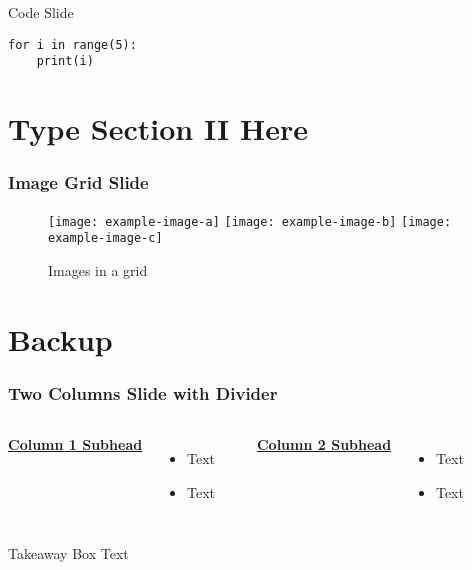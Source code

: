 \documentclass[11pt,aspectratio=169] {beamer}
\begin{document}
\begin{frame}[fragile]{Code Slide}
\begin{verbatim}
for i in range(5):
    print(i)
\end{verbatim}
\end{frame}
\section{Type Section II Here}

\begin{frame}
\frametitle{Image Grid Slide}
\begin{figure}
\texttt{[image: example-image-a]}
\texttt{[image: example-image-b]}
\texttt{[image: example-image-c]}
\caption{Images in a grid}
\end{figure}
\end{frame}

\bgroup
{}
\begin{frame}[plain]{}
\end{frame}
\egroup

\section{Backup}
\begin{frame}[t]
\frametitle{Two Columns Slide with Divider}
\begin{columns}[T]
\underline{\textbf{Column 1 Subhead}}
\begin{itemize}
\item Text
\item Text
\end{itemize}

\centering
\rule{0.5pt}{4cm} %

\underline{\textbf{Column 2 Subhead}}
\begin{itemize}
\item Text
\item Text
\end{itemize}
\end{columns}
\vfill
\begin{block}{Takeaway Box}
Text
\end{block}
\vfill
\end{frame}
\end{document}
